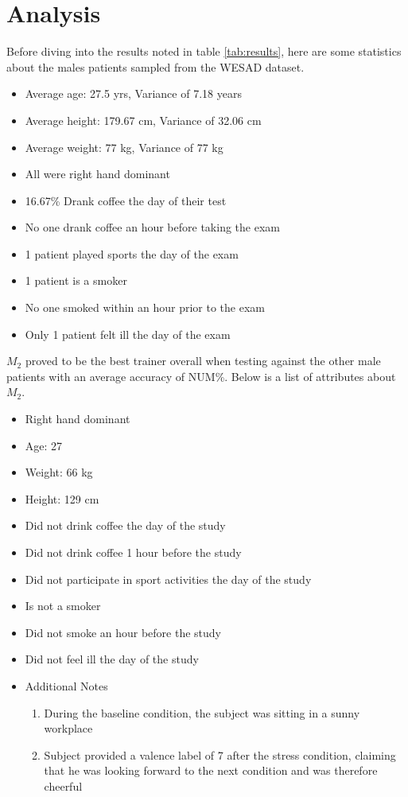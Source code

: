 \section{Analysis}
\label{sec:analysis}

Before diving into the results noted in table \ref{tab:results}, here are some 
statistics about the males patients sampled from the WESAD dataset.

\begin{itemize}
	\item Average age: 27.5 yrs, Variance of 7.18 years
	\item Average height: 179.67 cm, Variance of 32.06 cm
	\item Average weight: 77 kg, Variance of 77 kg
	\item All were right hand dominant
	\item 16.67\% Drank coffee the day of their test
	\item No one drank coffee an hour before taking the exam
	\item 1 patient played sports the day of the exam
	\item 1 patient is a smoker
	\item No one smoked within an hour prior to the exam
	\item Only 1 patient felt ill the day of the exam
\end{itemize}
\bigskip 
$M_2$ proved to be the best trainer overall when testing against the other male patients 
with an average accuracy of NUM\%. Below is a list of attributes about $M_2$.

\begin{itemize}
	\item Right hand dominant
	\item Age: 27
	\item Weight: 66 kg
	\item Height: 129 cm
	\item Did not drink coffee the day of the study
	\item Did not drink coffee 1 hour before the study
	\item Did not participate in sport activities the day of the study
	\item Is not a smoker
	\item Did not smoke an hour before the study
	\item Did not feel ill the day of the study
	\item Additional Notes
	\begin{enumerate}
		\item During the baseline condition, the subject was sitting in a sunny workplace
		\item Subject provided a valence label of 7 after the stress condition, claiming that he was looking forward to the next condition and was therefore cheerful
	\end{enumerate}
\end{itemize}

